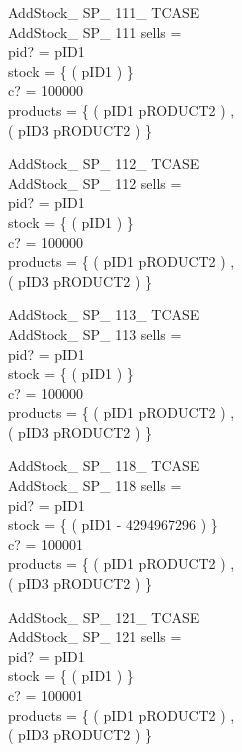 \begin{schema}{AddStock\_ SP\_ 111\_ TCASE}\\
AddStock\_ SP\_ 111
\where
sells =~\emptyset \\
pid? = pID1 \\
stock = \{ ( pID1  ) \} \\
c? = 100000 \\
products = \{ ( pID1 \mapsto pRODUCT2 ) , \\ ( pID3 \mapsto pRODUCT2 ) \}
\end{schema}


\begin{schema}{AddStock\_ SP\_ 112\_ TCASE}\\
AddStock\_ SP\_ 112
\where
sells =~\emptyset \\
pid? = pID1 \\
stock = \{ ( pID1  ) \} \\
c? = 100000 \\
products = \{ ( pID1 \mapsto pRODUCT2 ) , \\ ( pID3 \mapsto pRODUCT2 ) \}
\end{schema}


\begin{schema}{AddStock\_ SP\_ 113\_ TCASE}\\
AddStock\_ SP\_ 113
\where
sells =~\emptyset \\
pid? = pID1 \\
stock = \{ ( pID1  ) \} \\
c? = 100000 \\
products = \{ ( pID1 \mapsto pRODUCT2 ) , \\ ( pID3 \mapsto pRODUCT2 ) \}
\end{schema}


\begin{schema}{AddStock\_ SP\_ 118\_ TCASE}\\
AddStock\_ SP\_ 118
\where
sells =~\emptyset \\
pid? = pID1 \\
stock = \{ ( pID1 \mapsto - 4294967296 ) \} \\
c? = 100001 \\
products = \{ ( pID1 \mapsto pRODUCT2 ) , \\ ( pID3 \mapsto pRODUCT2 ) \}
\end{schema}


\begin{schema}{AddStock\_ SP\_ 121\_ TCASE}\\
AddStock\_ SP\_ 121
\where
sells =~\emptyset \\
pid? = pID1 \\
stock = \{ ( pID1  ) \} \\
c? = 100001 \\
products = \{ ( pID1 \mapsto pRODUCT2 ) , \\ ( pID3 \mapsto pRODUCT2 ) \}
\end{schema}


